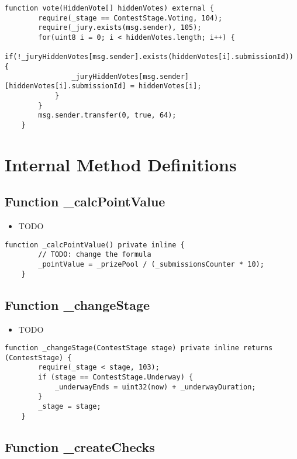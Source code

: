 \begin{lstlisting}[firstnumber=134]
    function vote(HiddenVote[] hiddenVotes) external {
        require(_stage == ContestStage.Voting, 104);
        require(_jury.exists(msg.sender), 105);
        for(uint8 i = 0; i < hiddenVotes.length; i++) {
            if(!_juryHiddenVotes[msg.sender].exists(hiddenVotes[i].submissionId)) {
                _juryHiddenVotes[msg.sender][hiddenVotes[i].submissionId] = hiddenVotes[i];
            }
        }
        msg.sender.transfer(0, true, 64);
    }
\end{lstlisting}

\section{Internal Method Definitions}


\subsection{Function \_{}calcPointValue}

\begin{itemize}
\item TODO
\end{itemize}

\begin{lstlisting}[firstnumber=188]
    function _calcPointValue() private inline {
        // TODO: change the formula
        _pointValue = _prizePool / (_submissionsCounter * 10);
    }
\end{lstlisting}

\subsection{Function \_{}changeStage}

\begin{itemize}
\item TODO
\end{itemize}

\begin{lstlisting}[firstnumber=106]
    function _changeStage(ContestStage stage) private inline returns (ContestStage) {
        require(_stage < stage, 103);
        if (stage == ContestStage.Underway) {
            _underwayEnds = uint32(now) + _underwayDuration;
        }
        _stage = stage;
    }
\end{lstlisting}

\subsection{Function \_{}createChecks}

